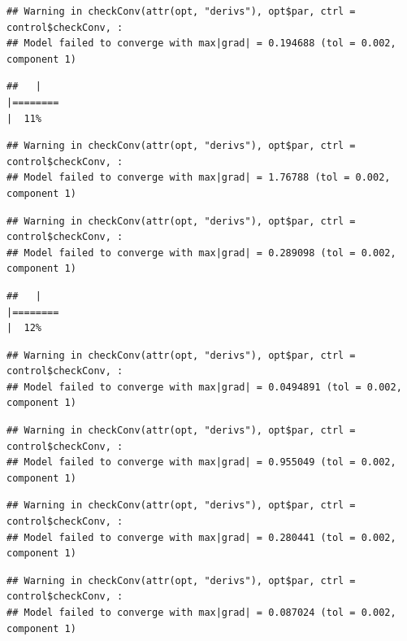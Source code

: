 \documentclass[
  12pt,
]{book}
\begin{document}
\begin{verbatim}
## Warning in checkConv(attr(opt, "derivs"), opt$par, ctrl = control$checkConv, :
## Model failed to converge with max|grad| = 0.194688 (tol = 0.002, component 1)
\end{verbatim}

\begin{verbatim}
##   |                                                                              |========                                                              |  11%
\end{verbatim}

\begin{verbatim}
## Warning in checkConv(attr(opt, "derivs"), opt$par, ctrl = control$checkConv, :
## Model failed to converge with max|grad| = 1.76788 (tol = 0.002, component 1)
\end{verbatim}

\begin{verbatim}
## Warning in checkConv(attr(opt, "derivs"), opt$par, ctrl = control$checkConv, :
## Model failed to converge with max|grad| = 0.289098 (tol = 0.002, component 1)
\end{verbatim}

\begin{verbatim}
##   |                                                                              |========                                                              |  12%
\end{verbatim}

\begin{verbatim}
## Warning in checkConv(attr(opt, "derivs"), opt$par, ctrl = control$checkConv, :
## Model failed to converge with max|grad| = 0.0494891 (tol = 0.002, component 1)
\end{verbatim}

\begin{verbatim}
## Warning in checkConv(attr(opt, "derivs"), opt$par, ctrl = control$checkConv, :
## Model failed to converge with max|grad| = 0.955049 (tol = 0.002, component 1)
\end{verbatim}

\begin{verbatim}
## Warning in checkConv(attr(opt, "derivs"), opt$par, ctrl = control$checkConv, :
## Model failed to converge with max|grad| = 0.280441 (tol = 0.002, component 1)
\end{verbatim}

\begin{verbatim}
## Warning in checkConv(attr(opt, "derivs"), opt$par, ctrl = control$checkConv, :
## Model failed to converge with max|grad| = 0.087024 (tol = 0.002, component 1)
\end{verbatim}
\end{document}
